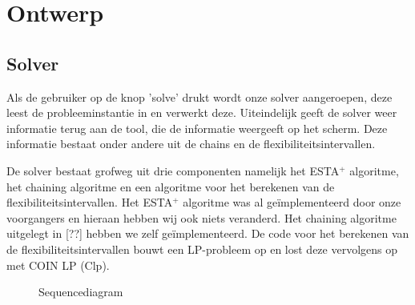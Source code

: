 \section{Ontwerp}
\subsection{Solver}
Als de gebruiker op de knop 'solve' drukt wordt onze solver aangeroepen, deze leest de probleeminstantie in en verwerkt deze. Uiteindelijk geeft de solver weer informatie terug aan de tool, die de informatie weergeeft op het scherm. Deze informatie bestaat onder andere uit de chains en de flexibiliteitsintervallen.

De solver bestaat grofweg uit drie componenten namelijk het ESTA$^+$ algoritme, het chaining algoritme en een algoritme voor het berekenen van de flexibiliteitsintervallen. Het ESTA$^+$ algoritme was al ge\"implementeerd door onze voorgangers en hieraan hebben wij ook niets veranderd. Het chaining algoritme uitgelegt in [??] hebben we zelf ge\"implementeerd. De code voor het berekenen van de flexibiliteitsintervallen bouwt een LP-probleem op en lost deze vervolgens op met COIN LP (Clp). 

\newpage
\begin{figure}[H]
\centering
\label{fig:sd}

\caption{Sequencediagram} 
\end{figure}

\newpage
